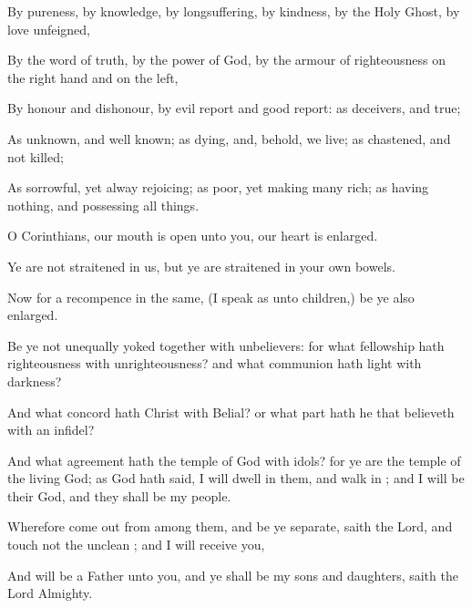 {By
pureness,
by
knowledge,
by
longsuffering,
by
kindness,
by the
Holy
Ghost,
by
love
unfeigned,

By the
word of
truth,
by the
power of
God,
by the
armour of
righteousness on the right
hand
and on the
left,

By
honour
and
dishonour,
by evil
report
and good
report:
as
deceivers,
and
{}
true;

As
unknown,
and
{} well
known;
as
dying,
and,
behold, we
live;
as
chastened,
and
not
killed;

As
sorrowful,
yet
alway
rejoicing;
as
poor,
yet
making
many
rich;
as
having
nothing,
and
{}
possessing all
things.


\par }{\PP {}O
{}
Corinthians,
our
mouth is
open
unto
you,
our
heart is
enlarged.

Ye
are
not
straitened
in
us,
but ye are
straitened
in your
own
bowels.

Now for a
recompence in the
same, (I
speak as
unto
{}
children,)
be
ye
also
enlarged.

Be
ye
not unequally yoked
together with
unbelievers:
for
what
fellowship hath
righteousness
with
unrighteousness?
and
what
communion hath
light
with
darkness?

And
what
concord hath
Christ
with
Belial?
or
what
part hath he that
believeth
with an
infidel?

And
what
agreement hath the
temple of
God
with
idols?
for
ye
are the
temple of the
living
God;
as
God hath
said, I will
dwell
in
them,
and walk
in
{};
and I will
be
their
God,
and
they shall
be
my
people.

Wherefore come
out
from
among
them,
and be ye
separate,
saith the
Lord,
and
touch
not the
unclean
{}; and
I will
receive
you,

And will
be a
Father
unto
you,
and
ye shall
be
my
sons
and
daughters,
saith the
Lord
Almighty.




\par }
